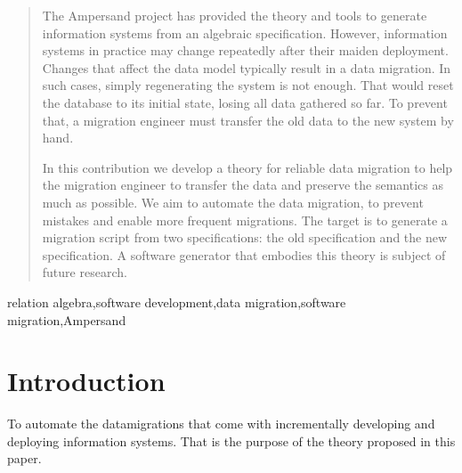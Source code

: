 \documentclass{elsarticle}
\begin{document}
\begin{abstract}
   The Ampersand project has provided the theory and tools to generate information systems from an algebraic specification.
   However, information systems in practice may change repeatedly after their maiden deployment.
   Changes that affect the data model typically result in a data migration.
   In such cases, simply regenerating the system is not enough.
   That would reset the database to its initial state, losing all data gathered so far.
   To prevent that, a migration engineer must transfer the old data to the new system by hand.

   In this contribution we develop a theory for reliable data migration to help the migration engineer
   to transfer the data and preserve the semantics as much as possible.
   We aim to automate the data migration,
   to prevent mistakes and enable more frequent migrations.
   The target is to generate a migration script from two specifications: the old specification and the new specification.
   A software generator that embodies this theory is subject of future research.
\end{abstract}

\begin{keyword}
relation algebra\sep software development\sep data migration\sep software migration\sep Ampersand
\end{keyword}
\maketitle

\section{Introduction}
\label{sct:Introduction}
   To automate the datamigrations that come with incrementally developing and deploying information systems.
   That is the purpose of the theory proposed in this paper.
\end{document}

